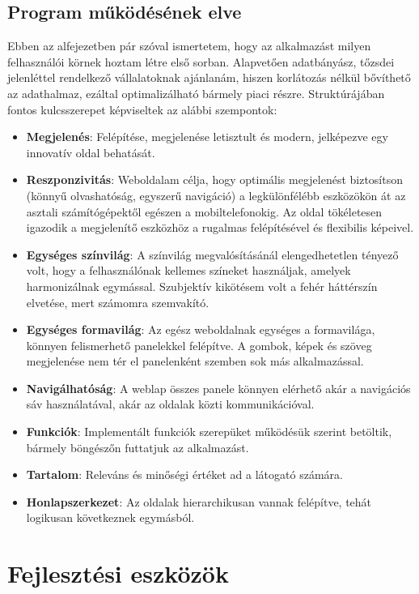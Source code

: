 \subsection{Program működésének elve}

Ebben az alfejezetben pár szóval ismertetem, hogy az alkalmazást milyen felhasználói körnek hoztam létre első sorban. Alapvetően adatbányász, tőzsdei jelenléttel rendelkező vállalatoknak ajánlanám, hiszen korlátozás nélkül bővíthető az adathalmaz, ezáltal optimalizálható bármely piaci részre. Struktúrájában fontos kulcsszerepet képviseltek az alábbi szempontok:

\begin{itemize}
\item \textbf{Megjelenés}: Felépítése, megjelenése letisztult és modern, jelképezve egy innovatív oldal behatását.
\item \textbf{Reszponzivitás}: Weboldalam célja, hogy optimális megjelenést biztosítson \\
(könnyű olvashatóság, egyszerű navigáció) a legkülönfélébb eszközökön át az asztali számítógépektől egészen a mobiltelefonokig. Az oldal tökéletesen igazodik a megjelenítő eszközhöz a rugalmas felépítésével és flexibilis képeivel.
\item \textbf{Egységes színvilág}: A színvilág megvalósításánál elengedhetetlen tényező volt, hogy a felhasználónak kellemes színeket használjak, amelyek harmonizálnak egymással. Szubjektív kikötésem volt a fehér háttérszín elvetése, mert számomra szemvakító.
\item \textbf{Egységes formavilág}: Az egész weboldalnak egységes a formavilága, könnyen felismerhető panelekkel felépítve. A gombok, képek és szöveg megjelenése nem tér el panelenként szemben sok más alkalmazással.
\item \textbf{Navigálhatóság}: A weblap összes panele könnyen elérhető akár a navigációs sáv használatával, akár az oldalak közti kommunikációval.
\item \textbf{Funkciók}: Implementált funkciók szerepüket működésük szerint betöltik, bármely böngészőn futtatjuk az alkalmazást.
\item \textbf{Tartalom}: Releváns és minőségi értéket ad a látogató számára.
\item \textbf{Honlapszerkezet}: Az oldalak hierarchikusan vannak felépítve, tehát logikusan következnek egymásból.
\end{itemize}

\section{Fejlesztési eszközök}

